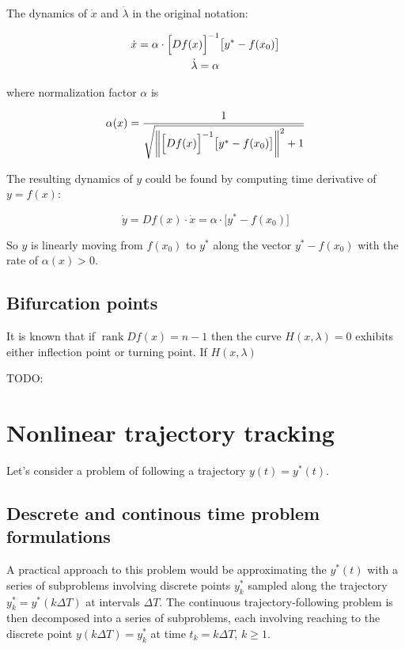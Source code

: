 \documentclass[11pt,american]{article}
\DeclareMathOperator{\rank}{\operatorname{rank}}
\begin{document}
The dynamics of $\dot x$ and $\dot \lambda$ in the original notation:

\begin{gather}
\dot x = \alpha \cdot \Bigl[ D f(x) \Bigr]^{-1} \bigl[ y^* - f(x_0) \bigr] \\
\dot \lambda = \alpha
\end{gather}

where normalization factor $\alpha$ is

\begin{equation}
\alpha(x) = \frac{1}{\sqrt{\left\| \Bigl[ D f(x) \Bigr]^{-1} \bigl[ y^* - f(x_0) \bigr] \right\|^2 + 1}}
\end{equation}

The resulting dynamics of $y$ could be found by computing time derivative of $y = f(x)$:

\begin{equation}
\dot y = D f(x) \cdot \dot x = \alpha \cdot \bigl[ y^* - f(x_0) \bigr]
\end{equation}

So $y$ is linearly moving from $f(x_0)$ to $y^*$ along the vector $y^* - f(x_0)$ with the rate of $\alpha(x) > 0$.

\subsection{Bifurcation points}

It is known that if $\rank D f(x) = n - 1$ then the curve $H(x,\lambda) = 0$ exhibits either inflection point or turning point.
If $H(x,\lambda)$ 

TODO:

\section{Nonlinear trajectory tracking}

Let's consider a problem of following a trajectory $y(t) = y^*(t)$. 

\subsection{Descrete and continous time problem formulations}

A practical approach to this problem would be approximating the $y^*(t)$ with a series of subproblems involving discrete points $y^*_k$ sampled along the trajectory $ y^*_k = y^*(k \Delta T) $ at intervals $ \Delta T $. The continuous trajectory-following problem is then decomposed into a series of subproblems, each involving reaching to the discrete point $y(k \Delta T) = y^*_k$ at time $ t_k = k \Delta T $, $k \ge 1$.
\end{document}
